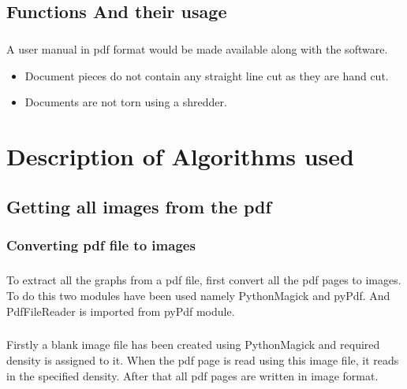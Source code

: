 \documentclass[12pts]{scrreprt}
\begin{document}
\section{Functions And their usage}
\paragraph{}
A user manual in pdf format would be made available along with the software.
\begin{itemize}
   \item Document pieces do not contain any straight line cut as they are hand cut.
   \item Documents are not torn using a shredder.
\end{itemize}

\chapter{Description of Algorithms used}

\section{Getting all images from the pdf}
\subsection{Converting pdf file to images}
\paragraph{}
To extract all the graphs from a pdf file, first convert all the pdf pages to images. To do this two modules have been used namely PythonMagick and pyPdf. And PdfFileReader is imported from pyPdf module.
\paragraph{}
Firstly a blank image file has been created using PythonMagick and required density is assigned to it. When the pdf page is read using this image file, it reads in the specified density. After that all pdf pages are written in image format.
\end{document}
